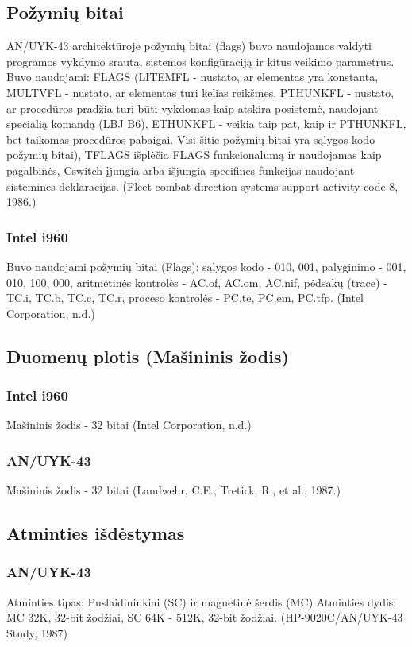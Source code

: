 \documentclass{article}
\begin{document}
\subsection{Požymių bitai}
AN/UYK-43 architektūroje požymių bitai (flags) buvo naudojamos valdyti programos vykdymo srautą, sistemos konfigūraciją ir kitus veikimo parametrus. Buvo naudojami: FLAGS (LITEMFL - nustato, ar elementas yra konstanta, MULTVFL - nustato, ar elementas turi kelias reikšmes, PTHUNKFL - nustato, ar procedūros pradžia turi būti vykdomas kaip atskira posistemė, naudojant specialią komandą (LBJ B6), ETHUNKFL - veikia taip pat, kaip ir PTHUNKFL, bet taikomas procedūros pabaigai. Visi šitie požymių bitai yra sąlygos kodo požymių bitai), TFLAGS išplėčia FLAGS funkcionalumą ir naudojamas kaip pagalbinės, Cswitch  įjungia arba išjungia specifines funkcijas naudojant sistemines deklaracijas. (Fleet combat direction systems support activity code 8, 1986.)
\subsubsection{Intel i960}
Buvo naudojami požymių bitai (Flags): sąlygos kodo - 010, 001, palyginimo - 001, 010, 100, 000, aritmetinės kontrolės - AC.of, AC.om, AC.nif, pėdsakų (trace) - TC.i, TC.b, TC.c, TC.r, proceso kontrolės - PC.te, PC.em, PC.tfp. (Intel Corporation, n.d.)
\subsection{Duomenų plotis (Mašininis žodis)}
\subsubsection{Intel i960}
Mašininis žodis - 32 bitai (Intel Corporation, n.d.)
\subsubsection{AN/UYK-43}
Mašininis žodis - 32 bitai (Landwehr, C.E., Tretick, R., et al., 1987.)
\subsection{Atminties išdėstymas}
\subsubsection{AN/UYK-43}
Atminties tipas: Puslaidininkiai (SC) ir  magnetinė šerdis (MC) Atminties dydis: MC 32K, 32-bit žodžiai, SC 64K - 512K, 32-bit žodžiai. (HP-9020C/AN/UYK-43 Study, 1987)
\end{document}
